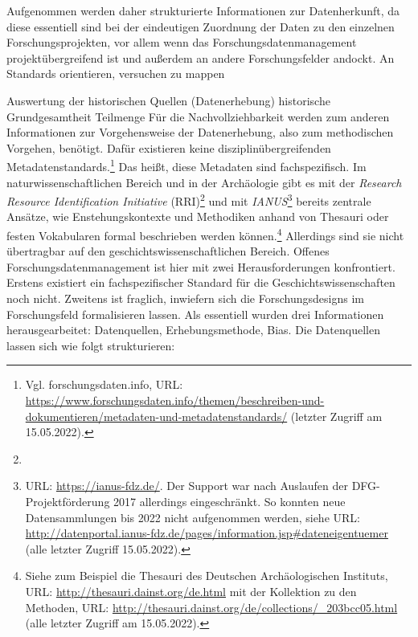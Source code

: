 Aufgenommen werden daher strukturierte Informationen zur Datenherkunft, da diese essentiell sind bei der eindeutigen Zuordnung der Daten zu den einzelnen Forschungsprojekten, vor allem wenn das Forschungsdatenmanagement projektübergreifend ist und außerdem an andere Forschungsfelder andockt. An Standards orientieren, versuchen zu mappen


Auswertung der historischen Quellen (Datenerhebung)
historische Grundgesamtheit Teilmenge
Für die Nachvollziehbarkeit werden zum anderen Informationen zur Vorgehensweise der Datenerhebung, also zum methodischen Vorgehen, benötigt. Dafür existieren keine disziplinübergreifenden Metadatenstandards.\footnote{Vgl. forschungsdaten.info, URL: \url{https://www.forschungsdaten.info/themen/beschreiben-und-dokumentieren/metadaten-und-metadatenstandards/} (letzter Zugriff am 15.05.2022).} Das heißt, diese Metadaten sind fachspezifisch. Im naturwissenschaftlichen Bereich und in der Archäologie gibt es mit der \textit{Research Resource Identification Initiative} (RRI)\footnote{} und mit \textit{IANUS}\footnote{URL: \url{https://ianus-fdz.de/}. Der Support war nach Auslaufen der DFG-Projektförderung 2017 allerdings eingeschränkt. So konnten neue Datensammlungen bis 2022 nicht aufgenommen werden, siehe URL: \url{http://datenportal.ianus-fdz.de/pages/information.jsp\#dateneigentuemer} (alle letzter Zugriff 15.05.2022).} bereits zentrale Ansätze, wie Enstehungskontexte und Methodiken anhand von Thesauri oder festen Vokabularen formal beschrieben werden können.\footnote{Siehe zum Beispiel die Thesauri des Deutschen Archäologischen Instituts, URL: \url{http://thesauri.dainst.org/de.html} mit der Kollektion zu den Methoden, URL: \url{http://thesauri.dainst.org/de/collections/\_203bcc05.html} (alle letzter Zugriff am 15.05.2022).} Allerdings sind sie nicht übertragbar auf den geschichtswissenschaftlichen Bereich. Offenes Forschungsdatenmanagement ist hier mit zwei Herausforderungen konfrontiert. Erstens existiert ein fachspezifischer Standard für die Geschichtswissenschaften noch nicht. Zweitens ist fraglich, inwiefern sich die Forschungsdesigns im Forschungsfeld formalisieren lassen. Als essentiell wurden drei Informationen herausgearbeitet: Datenquellen, Erhebungsmethode, Bias. Die Datenquellen lassen sich wie folgt strukturieren:

